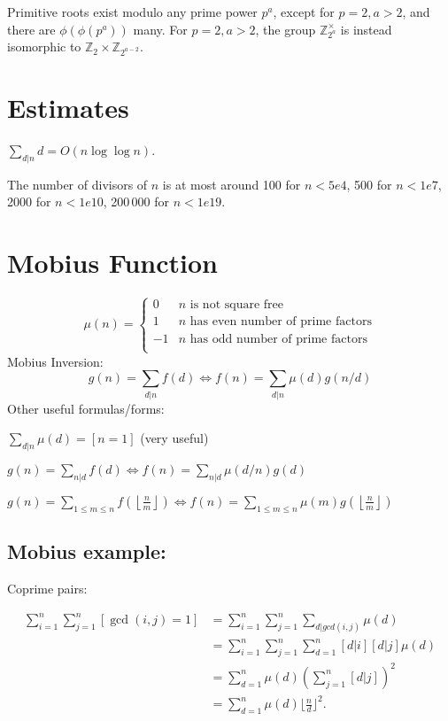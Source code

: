 	Primitive roots exist modulo any prime power $p^a$, except for $p = 2, a > 2$, and there are $\phi(\phi(p^a))$ many.
	For $p = 2, a > 2$, the group $\mathbb Z_{2^a}^\times$ is instead isomorphic to $\mathbb Z_2 \times \mathbb Z_{2^{a-2}}$.

\section{Estimates}
	$\sum_{d|n} d = O(n \log \log n)$.

	The number of divisors of $n$ is at most around 100 for $n < 5e4$, 500 for $n < 1e7$, 2000 for $n < 1e10$, 200\,000 for $n < 1e19$.

\section{Mobius Function}
\[
	\mu(n) = \begin{cases} 0 & n \textrm{ is not square free}\\ 1 & n \textrm{ has even number of prime factors}\\ -1 & n \textrm{ has odd number of prime factors}\\\end{cases}
\]
  Mobius Inversion:
  \[ g(n) = \sum_{d|n} f(d) \Leftrightarrow f(n) = \sum_{d|n} \mu(d)g(n/d) \]
  Other useful formulas/forms:

  $ \sum_{d | n} \mu(d) = [ n = 1] $ (very useful)

  $ g(n) = \sum_{n|d} f(d) \Leftrightarrow f(n) = \sum_{n|d} \mu(d/n)g(d)$

 $ g(n) = \sum_{1 \leq m \leq n} f(\left\lfloor\frac{n}{m}\right \rfloor ) \Leftrightarrow f(n) = \sum_{1\leq m\leq n} \mu(m)g(\left\lfloor\frac{n}{m}\right\rfloor)$


\subsection{Mobius example:}

Coprime pairs:

 \begin{align*}
        \sum_{i=1}^n \sum_{j=1}^n [\gcd(i,j) = 1] &= \sum_{i = 1}^n \sum_{j=1}^n \sum_{d|gcd(i,j)} \mu(d) \\
        &= \sum_{i=1}^n \sum_{j=1}^n \sum_{d=1}^n [d|i][d|j] \mu(d)\\
        &= \sum_{d=1}^n \mu(d) (\sum_{j=1}^n [d|j])^2\\
        &= \sum_{d=1}^n \mu(d)\lfloor{\frac{n}{d}}\rfloor^2.
\end{align*}

